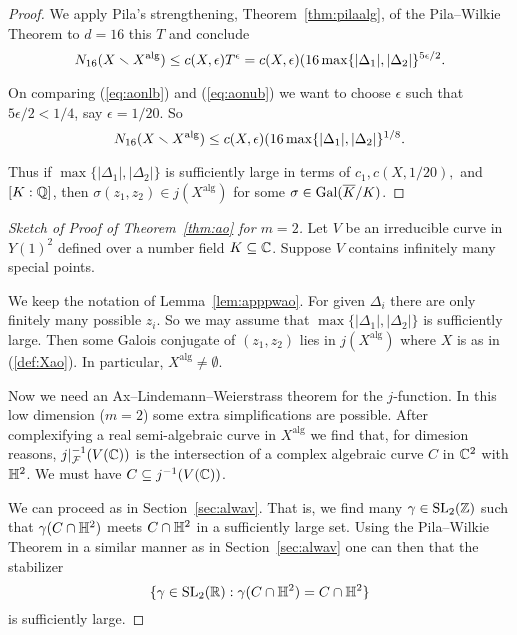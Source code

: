 \begin{proof}
  We apply Pila's strengthening, Theorem~\ref{thm:pilaalg},  of the
  Pila--Wilkie Theorem to $d=16$ this $T$ and conclude
  \begin{equation}
    \label{eq:aonub}
    N_{16}(X\smallsetminus X^{\mathrm{alg}}) \le c(X,\epsilon) T^\epsilon
    = c(X,\epsilon) (16\max\{|\Delta_1|,|\Delta_2|\}^{5\epsilon/2}.
  \end{equation}

  On comparing (\ref{eq:aonlb}) and (\ref{eq:aonub}) we want to 
  choose $\epsilon$ such that $5\epsilon/2
  <1/4$, say $\epsilon = 1/20$.
  So
  \begin{equation*}
    N_{16}(X\smallsetminus X^{\mathrm{alg}}) \le
     c(X,\epsilon) (16\max\{|\Delta_1|,|\Delta_2|\}^{1/8}.
   \end{equation*}
   
  Thus if
  $\max\{|\Delta_1|,|\Delta_2|\}$ is sufficiently large in terms of
  $c_1,c(X,1/20),$ and $[K:{\mathbb{Q}}]$, then  $\sigma(z_1,z_2) \in
  j(X^{\mathrm{alg}})$ for some $\sigma\in \mathrm{Gal}(\overline{K}/K)$.  
\end{proof}

\begin{proof}[Sketch of Proof of Theorem~\ref{thm:ao} for $m=2$]
  Let $V$ be an irreducible curve in $Y(1)^2$ defined over a number
  field $K\subseteq{\mathbb{C}}$. Suppose $V$ contains infinitely many special points.

  We keep the notation of Lemma~\ref{lem:apppwao}. For given
  $\Delta_i$ there are only finitely many possible $z_i$. So we may
  assume that $\max\{|\Delta_1|,|\Delta_2|\}$ is sufficiently large.
  Then some Galois conjugate of $(z_1,z_2)$ lies in
  $j(X^{\mathrm{alg}})$ where $X$ is as in (\ref{def:Xao}). In
  particular, $X^{\mathrm{alg}}\not=\emptyset$. 

  Now we need an Ax--Lindemann--Weierstrass theorem  for the
  $j$-function.
  In this low dimension ($m=2$) some extra simplifications are
  possible.
  After complexifying a real semi-algebraic curve in
  $X^{\mathrm{alg}}$ we find that, for dimesion reasons, 
  $j|_{{\mathcal F}}^{-1}(V({\mathbb{C}}))$ is the intersection of a complex algebraic
  curve $C$ in ${\mathbb{C}}^2$ with ${\mathbb{H}}^2$. We must have
  $C \subseteq j^{-1}(V({\mathbb{C}}))$. 

  We can proceed as in Section~\ref{sec:alwav}. That is, we find many 
  $\gamma\in \mathrm{SL}_2({\mathbb{Z}})$ such that $\gamma (C\cap {\mathbb{H}}^2)$
  meets $C\cap{\mathbb{H}}^2$ in a sufficiently large set.  
  Using the Pila--Wilkie Theorem in a similar manner as in
  Section~\ref{sec:alwav} one can then that the stabilizer 
  \begin{equation*}
    \{\gamma \in \mathrm{SL}_2({\mathbb{R}}) : \gamma (C\cap{\mathbb{H}}^2) = C\cap
    {\mathbb{H}}^2 \}
  \end{equation*}
  is sufficiently large. 
  
  
\end{proof}
